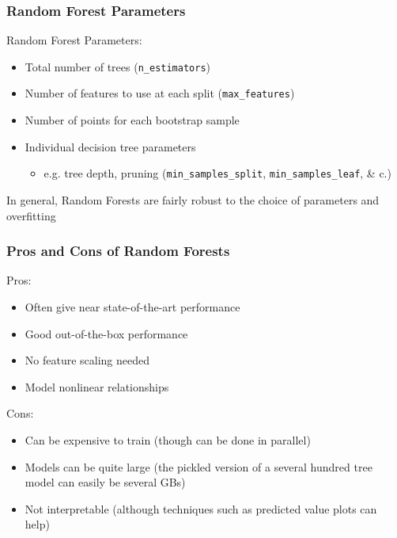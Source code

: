 \documentclass[table,dvipsnames]{beamer}
\begin{document}

\begin{frame}
\frametitle{Random Forest Parameters}
Random Forest Parameters:
\begin{itemize}
    \item Total number of trees (\texttt{n_estimators})
    \item Number of features to use at each split (\texttt{max_features})
    \item Number of points for each bootstrap sample
    \item Individual decision tree parameters
    \begin{itemize}
        \item e.g. tree depth, pruning (\texttt{min_samples_split}, \texttt{min_samples_leaf}, \& c.)
    \end{itemize}
\end{itemize}

In general, Random Forests are fairly robust to the choice of parameters and overfitting

\end{frame}


\begin{frame}
\frametitle{Pros and Cons of Random Forests}
Pros:
\begin{itemize}
    \item Often give near state-of-the-art performance
    \item Good out-of-the-box performance
    \item No feature scaling needed
    \item Model nonlinear relationships
\end{itemize}

Cons:
\begin{itemize}
    \item Can be expensive to train (though can be done in parallel)
    \item Models can be quite large (the pickled version of a several hundred tree model can easily be several GBs)
    \item Not interpretable (although techniques such as predicted value plots can help)
\end{itemize}
\end{frame}
\end{document}
